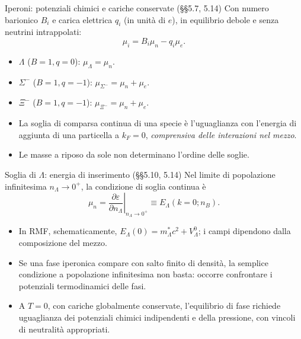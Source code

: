 \begin{frame}[t]{Iperoni: potenziali chimici e cariche conservate (§§5.7, 5.14)}
\small
Con numero barionico $B_i$ e carica elettrica $q_i$ (in unità di $e$), in equilibrio debole e senza neutrini intrappolati:
\[
\mu_i=B_i\mu_n-q_i\mu_e.
\]
\begin{itemize}
\item $\Lambda$ ($B=1,q=0$): $\mu_\Lambda=\mu_n$.
\item $\Sigma^-$ ($B=1,q=-1$): $\mu_{\Sigma^-}=\mu_n+\mu_e$.
\item $\Xi^-$ ($B=1,q=-1$): $\mu_{\Xi^-}=\mu_n+\mu_e$.
\item La soglia di comparsa continua di una specie è l'uguaglianza con l'energia di aggiunta di una particella a $k_F=0$, \emph{comprensiva delle interazioni nel mezzo}.
\item Le masse a riposo da sole non determinano l'ordine delle soglie.
\end{itemize}
\end{frame}

\begin{frame}[t]{Soglia di $\Lambda$: energia di inserimento (§§5.10, 5.14)}
\small
Nel limite di popolazione infinitesima $n_\Lambda\to0^+$, la condizione di soglia continua è
\[
\mu_n=\left.\frac{\partial\varepsilon}{\partial n_\Lambda}\right|_{n_\Lambda\to0^+}
\equiv E_\Lambda(k=0;n_B).
\]
\begin{itemize}
\item In RMF, schematicamente, $E_\Lambda(0)=m_\Lambda^*c^2+V_\Lambda^0$; i campi dipendono dalla composizione del mezzo.
\item Se una fase iperonica compare con salto finito di densità, la semplice condizione a popolazione infinitesima non basta: occorre confrontare i potenziali termodinamici delle fasi.
\item A $T=0$, con cariche globalmente conservate, l'equilibrio di fase richiede uguaglianza dei potenziali chimici indipendenti e della pressione, con vincoli di neutralità appropriati.
\end{itemize}
\end{frame}

